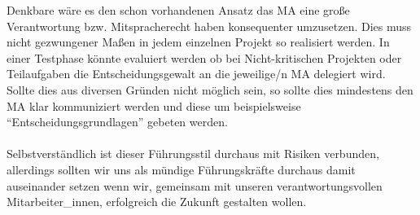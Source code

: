 Denkbare wäre es den schon vorhandenen Ansatz das \ac{MA} eine große Verantwortung bzw. Mitspracherecht haben konsequenter umzusetzen. 
Dies muss nicht gezwungener Maßen in jedem einzelnen Projekt so realisiert werden. 
In einer Testphase könnte evaluiert werden ob bei Nicht-kritischen Projekten oder Teilaufgaben die Entscheidungsgewalt an die jeweilige/n \ac{MA} delegiert wird. 
Sollte dies aus diversen Gründen nicht möglich sein, so sollte dies mindestens den \ac{MA} klar kommuniziert werden und diese um beispielsweise "`Entscheidungsgrundlagen"' gebeten werden. \\
\\
Selbstverständlich ist dieser Führungsstil durchaus mit Risiken verbunden, allerdings sollten wir uns als mündige Führungskräfte durchaus damit auseinander setzen wenn wir, gemeinsam mit unseren verantwortungsvollen Mitarbeiter\_innen, erfolgreich die Zukunft gestalten wollen.
 

